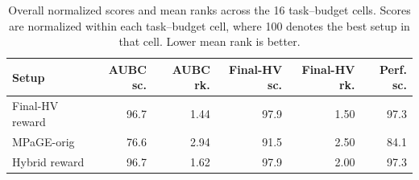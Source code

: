 \begin{table}[H]
\centering
\caption[Overall main comparison]{Overall normalized scores and mean ranks across the 16 task--budget cells. Scores are normalized within each task--budget cell, where 100 denotes the best setup in that cell. Lower mean rank is better.}
\label{tab:all-overall-scores}
\small
\setlength{\tabcolsep}{4pt}
\centering
\begin{tabular}{lrrrrr}
\toprule
Setup & AUBC sc. & AUBC rk. & Final-HV sc. & Final-HV rk. & Perf. sc. \\
\midrule
Final-HV reward & 96.7 & 1.44 & 97.9 & 1.50 & 97.3 \\
MPaGE-orig & 76.6 & 2.94 & 91.5 & 2.50 & 84.1 \\
Hybrid reward & 96.7 & 1.62 & 97.9 & 2.00 & 97.3 \\
\bottomrule
\end{tabular}
\end{table}
